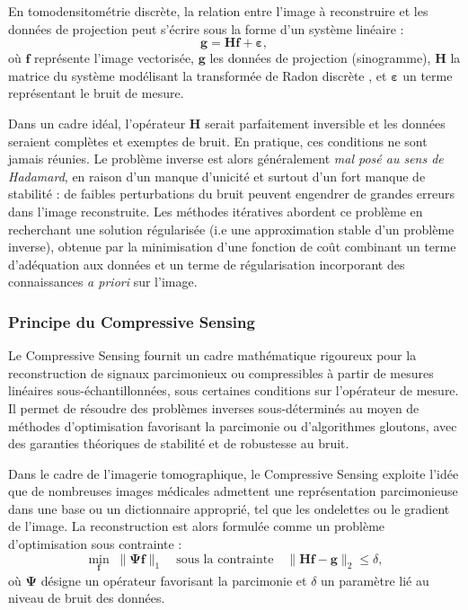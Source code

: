 En tomodensitométrie discrète, la relation entre l'image à reconstruire et les données
de projection peut s'écrire sous la forme d'un système linéaire :
\begin{equation}
    \mathbf{g} = \mathbf{H}\mathbf{f} + \boldsymbol{\varepsilon},
\end{equation}
où $\mathbf{f}$ représente l'image vectorisée, $\mathbf{g}$ les données de projection
(sinogramme), $\mathbf{H}$ la matrice du système modélisant la transformée de Radon discrète \cite{11},
et $\boldsymbol{\varepsilon}$ un terme représentant le bruit de mesure.

Dans un cadre idéal, l'opérateur $\mathbf{H}$ serait parfaitement inversible et les données
seraient complètes et exemptes de bruit. En pratique, ces conditions ne sont jamais réunies.
Le problème inverse est alors généralement \textit{mal posé au sens de Hadamard}, en raison
d'un manque d'unicité et surtout d'un fort manque de stabilité : de faibles perturbations du
bruit peuvent engendrer de grandes erreurs dans l'image reconstruite. Les méthodes itératives
abordent ce problème en recherchant une solution régularisée (i.e une approximation stable d'un problème inverse), obtenue par la minimisation
d'une fonction de coût combinant un terme d'adéquation aux données et un terme de
régularisation incorporant des connaissances \emph{a priori} sur l'image.

\subsubsection{Principe du Compressive Sensing}
Le Compressive Sensing fournit un cadre mathématique rigoureux pour la reconstruction de
signaux parcimonieux ou compressibles à partir de mesures linéaires sous-échantillonnées,
sous certaines conditions sur l'opérateur de mesure. Il permet de résoudre des problèmes
inverses sous-déterminés au moyen de méthodes d'optimisation favorisant la parcimonie ou
d'algorithmes gloutons, avec des garanties théoriques de stabilité et de robustesse au bruit.

Dans le cadre de l'imagerie tomographique, le Compressive Sensing exploite l'idée que de
nombreuses images médicales admettent une représentation parcimonieuse dans une base ou un
dictionnaire approprié, tel que les ondelettes ou le gradient de l'image. La reconstruction
est alors formulée comme un problème d'optimisation sous contrainte :
\begin{equation}
    \min_{\mathbf{f}} \; \|\mathbf{\Psi}\mathbf{f}\|_1
    \quad \text{sous la contrainte} \quad
    \|\mathbf{H}\mathbf{f} - \mathbf{g}\|_2 \leq \delta,
\end{equation}
où $\mathbf{\Psi}$ désigne un opérateur favorisant la parcimonie et $\delta$ un paramètre
lié au niveau de bruit des données.

